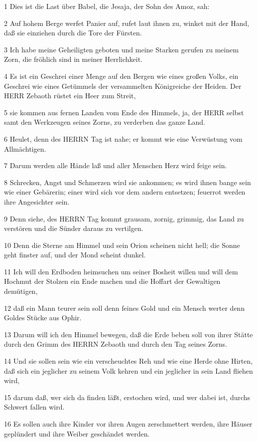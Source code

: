 \par 1 Dies ist die Last über Babel, die Jesaja, der Sohn des Amoz, sah:
\par 2 Auf hohem Berge werfet Panier auf, rufet laut ihnen zu, winket mit der Hand, daß sie einziehen durch die Tore der Fürsten.
\par 3 Ich habe meine Geheiligten geboten und meine Starken gerufen zu meinem Zorn, die fröhlich sind in meiner Herrlichkeit.
\par 4 Es ist ein Geschrei einer Menge auf den Bergen wie eines großen Volks, ein Geschrei wie eines Getümmels der versammelten Königreiche der Heiden. Der HERR Zebaoth rüstet ein Heer zum Streit,
\par 5 sie kommen aus fernen Landen vom Ende des Himmels, ja, der HERR selbst samt den Werkzeugen seines Zorns, zu verderben das ganze Land.
\par 6 Heulet, denn des HERRN Tag ist nahe; er kommt wie eine Verwüstung vom Allmächtigen.
\par 7 Darum werden alle Hände laß und aller Menschen Herz wird feige sein.
\par 8 Schrecken, Angst und Schmerzen wird sie ankommen; es wird ihnen bange sein wie einer Gebärerin; einer wird sich vor dem andern entsetzen; feuerrot werden ihre Angesichter sein.
\par 9 Denn siehe, des HERRN Tag kommt grausam, zornig, grimmig, das Land zu verstören und die Sünder daraus zu vertilgen.
\par 10 Denn die Sterne am Himmel und sein Orion scheinen nicht hell; die Sonne geht finster auf, und der Mond scheint dunkel.
\par 11 Ich will den Erdboden heimsuchen um seiner Bosheit willen und will dem Hochmut der Stolzen ein Ende machen und die Hoffart der Gewaltigen demütigen,
\par 12 daß ein Mann teurer sein soll denn feines Gold und ein Mensch werter denn Goldes Stücke aus Ophir.
\par 13 Darum will ich den Himmel bewegen, daß die Erde beben soll von ihrer Stätte durch den Grimm des HERRN Zebaoth und durch den Tag seines Zorns.
\par 14 Und sie sollen sein wie ein verscheuchtes Reh und wie eine Herde ohne Hirten, daß sich ein jeglicher zu seinem Volk kehren und ein jeglicher in sein Land fliehen wird,
\par 15 darum daß, wer sich da finden läßt, erstochen wird, und wer dabei ist, durchs Schwert fallen wird.
\par 16 Es sollen auch ihre Kinder vor ihren Augen zerschmettert werden, ihre Häuser geplündert und ihre Weiber geschändet werden.
